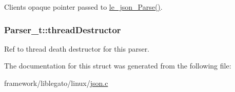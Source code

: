 Client\textquotesingle{}s opaque pointer passed to \hyperlink{le__json_8h_a610f180628f8e5be75fe5a08533124df}{le\+\_\+json\+\_\+\+Parse()}. 

\subsubsection[{\texorpdfstring{thread\+Destructor}{threadDestructor}}]{ Parser\+\_\+t\+::thread\+Destructor}\hypertarget{struct_parser__t_aed7e9530c05c3ed345c7b568a4696ae1}{}\label{struct_parser__t_aed7e9530c05c3ed345c7b568a4696ae1}


Ref to thread death destructor for this parser. 



The documentation for this struct was generated from the following file\+:\begin{DoxyCompactItemize}
\item 
framework/liblegato/linux/\hyperlink{json_8c}{json.\+c}\end{DoxyCompactItemize}
